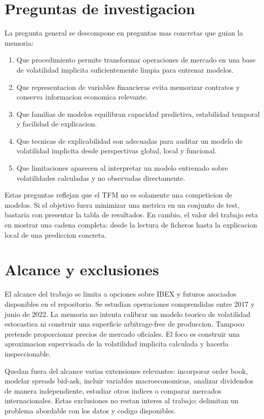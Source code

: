 \section{Preguntas de investigacion}

La pregunta general se descompone en preguntas mas concretas que guian la memoria:

\begin{enumerate}
  \item Que procedimiento permite transformar operaciones de mercado en una base de volatilidad implicita suficientemente limpia para entrenar modelos.
  \item Que representacion de variables financieras evita memorizar contratos y conserva informacion economica relevante.
  \item Que familias de modelos equilibran capacidad predictiva, estabilidad temporal y facilidad de explicacion.
  \item Que tecnicas de explicabilidad son adecuadas para auditar un modelo de volatilidad implicita desde perspectivas global, local y funcional.
  \item Que limitaciones aparecen al interpretar un modelo entrenado sobre volatilidades calculadas y no observadas directamente.
\end{enumerate}

Estas preguntas reflejan que el TFM no es solamente una competicion de modelos. Si el objetivo fuera minimizar una metrica en un conjunto de test, bastaria con presentar la tabla de resultados. En cambio, el valor del trabajo esta en mostrar una cadena completa: desde la lectura de ficheros hasta la explicacion local de una prediccion concreta.

\section{Alcance y exclusiones}

El alcance del trabajo se limita a opciones sobre IBEX y futuros asociados disponibles en el repositorio. Se estudian operaciones comprendidas entre 2017 y junio de 2022. La memoria no intenta calibrar un modelo teorico de volatilidad estocastica ni construir una superficie arbitrage-free de produccion. Tampoco pretende proporcionar precios de mercado oficiales. El foco es construir una aproximacion supervisada de la volatilidad implicita calculada y hacerla inspeccionable.

Quedan fuera del alcance varias extensiones relevantes: incorporar order book, modelar spreads bid-ask, incluir variables macroeconomicas, analizar dividendos de manera independiente, estudiar otros indices o comparar mercados internacionales. Estas exclusiones no restan interes al trabajo; delimitan un problema abordable con los datos y codigo disponibles.

